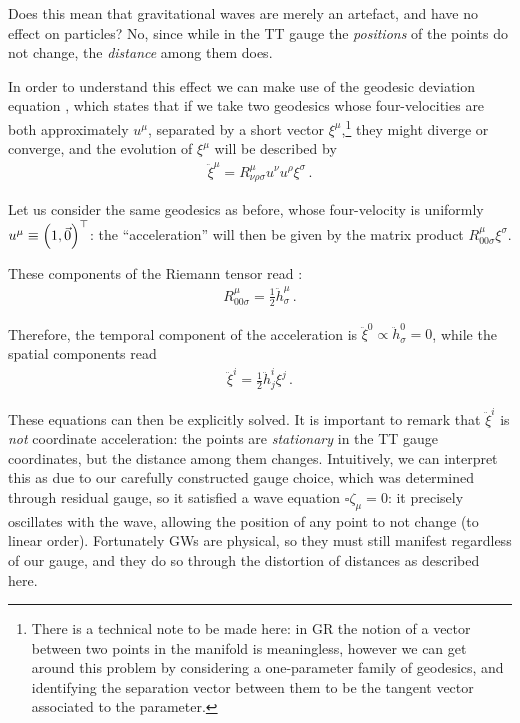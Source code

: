 \documentclass[main.tex]{subfiles}
\begin{document}
Does this mean that gravitational waves are merely an artefact, and have no effect on particles? 
No, since while in the \ac{TT} gauge the \emph{positions} of the points do not change, the \emph{distance} among them does.

In order to understand this effect we can make use of the geodesic deviation equation \cite[section 3.10]{carrollSpacetimeGeometryIntroduction2019}, which states that if we take two geodesics whose four-velocities are both approximately \(u^{\mu }\), separated by a short vector \(\xi ^{\mu }\),\footnote{There is a technical note to be made here: in GR the notion of a vector between two points in the manifold is meaningless, however we can get around this problem by considering a one-parameter family of geodesics, and identifying the separation vector between them to be the tangent vector associated to the parameter.} they might diverge or converge, and the evolution of \(\xi^{\mu }\) will be described by
%
\begin{align}
\ddot{\xi}^{\mu } = R^{\mu }_{\nu \rho \sigma } u^{\nu } u^{\rho } \xi^{\sigma }
\,.
\end{align}

Let us consider the same geodesics as before, whose four-velocity is uniformly \(u^{\mu } \equiv \qty(1, \vec{0})^{\top}\): the ``acceleration'' will then be given by the matrix product \(R^{\mu }_{00\sigma } \xi^{\sigma }\). 

These components of the Riemann tensor read \cite[eq.\ 7.106]{carrollSpacetimeGeometryIntroduction2019}: 
%
\begin{align}
R^{\mu }_{00 \sigma } = \frac{1}{2} \ddot{h}^{\mu }_{\sigma }
\,.
\end{align}

Therefore, the temporal component of the acceleration is \(\ddot{\xi}^{0} \propto \ddot{h}^{0}_{\sigma } = 0 \), while the spatial components read 
%
\begin{align} \label{eq:tidal-acceleration-TT-gauge}
\ddot{\xi}
^{i} = \frac{1}{2} \ddot{h}^{i}_{j} \xi^{j}
\,.
\end{align}

These equations can then be explicitly solved.
It is important to remark that \(\ddot{\xi }^{i}\) is \emph{not} coordinate acceleration: the points are \emph{stationary} in the \ac{TT} gauge coordinates, but the distance among them changes.
Intuitively, we can interpret this as due to our carefully constructed gauge choice, which was determined through residual gauge, so it satisfied a wave equation \(\square \zeta _\mu =0 \): it precisely oscillates with the wave, allowing the position of any point to not change (to linear order). 
Fortunately \acsp{GW} are physical, so they must still manifest regardless of our gauge, and they do so through the distortion of distances as described here.
\end{document}
